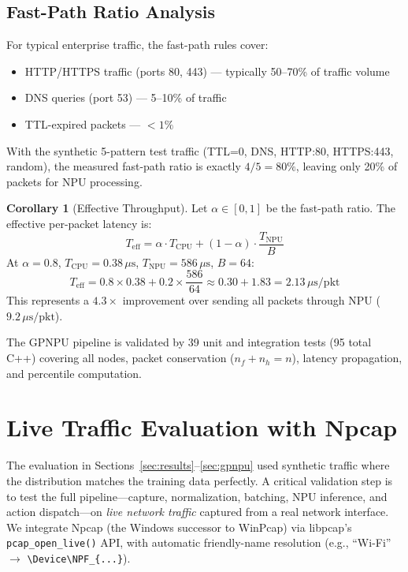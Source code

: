 \documentclass[11pt,a4paper,twoside]{article}
\theoremstyle{definition}
\newtheorem{corollary}[theorem]{Corollary}
\theoremstyle{remark}
\begin{document}
\subsection{Fast-Path Ratio Analysis}

For typical enterprise traffic, the fast-path rules cover:
\begin{itemize}
  \item HTTP/HTTPS traffic (ports 80, 443) --- typically 50--70\% of traffic volume
  \item DNS queries (port 53) --- 5--10\% of traffic
  \item TTL-expired packets --- $< 1\%$
\end{itemize}

With the synthetic 5-pattern test traffic (TTL=0, DNS, HTTP:80, HTTPS:443, random), the measured fast-path ratio is exactly $4/5 = 80\%$, leaving only 20\% of packets for NPU processing.

\begin{corollary}[Effective Throughput]
\label{cor:effective-throughput}
Let $\alpha \in [0,1]$ be the fast-path ratio. The effective per-packet latency is:
\begin{equation}
T_{\text{eff}} = \alpha \cdot T_{\text{CPU}} + (1 - \alpha) \cdot \frac{T_{\text{NPU}}}{B}
\end{equation}
At $\alpha = 0.8$, $T_{\text{CPU}} = 0.38\,\mu\text{s}$, $T_{\text{NPU}} = 586\,\mu\text{s}$, $B = 64$:
\begin{equation}
T_{\text{eff}} = 0.8 \times 0.38 + 0.2 \times \frac{586}{64} \approx 0.30 + 1.83 = 2.13\,\mu\text{s}/\text{pkt}
\end{equation}
This represents a $\mathbf{4.3\times}$ improvement over sending all packets through NPU ($9.2\,\mu\text{s}/\text{pkt}$).
\end{corollary}

The GPNPU pipeline is validated by 39 unit and integration tests (95 total C++) covering all nodes, packet conservation ($n_f + n_h = n$), latency propagation, and percentile computation.


\section{Live Traffic Evaluation with Npcap}
\label{sec:live-eval}

The evaluation in Sections~\ref{sec:results}--\ref{sec:gpnpu} used synthetic traffic where the distribution matches the training data perfectly. A critical validation step is to test the full pipeline---capture, normalization, batching, NPU inference, and action dispatch---on \emph{live network traffic} captured from a real network interface. We integrate Npcap (the Windows successor to WinPcap) via libpcap's \texttt{pcap\_open\_live()} API, with automatic friendly-name resolution (e.g., ``Wi-Fi'' $\to$ \texttt{\textbackslash Device\textbackslash NPF\_\{...\}}).
\end{document}
